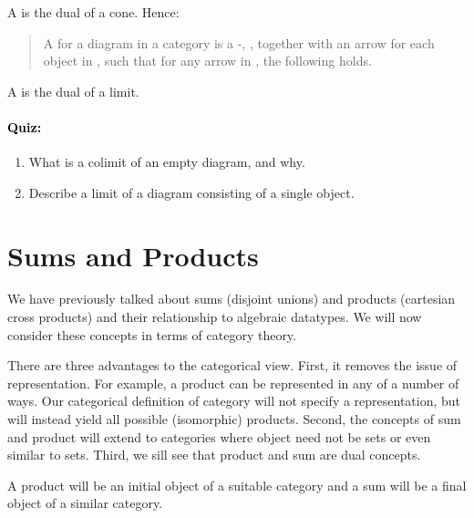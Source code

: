 \documentclass{seminar}
\newcommand{\CC}{\tm{\cal C}}
\newcommand{\CCC}{\tm{{\cal C}\,}}
\begin{document}
\begin{slide}
A  is the dual of a cone.  Hence:
\begin{quote}
A  for a diagram  in a category \CCC is a
\CC-, , together with an arrow
 for each
object  in , such that for any arrow
 in , the following holds.
\begin{codenott}
\end{codenott}
\end{quote}
A  is the dual of a limit.

\paragraph{\textcolor{black}{Quiz:}}

\color{QuoteColor}
\begin{enumerate}
\item What is a colimit of an empty diagram, and why.
\item Describe a limit of a diagram consisting of a single object.
\end{enumerate}
\color{black}

\newslide

\section*{Sums and Products}

We have previously talked about sums (disjoint unions) and products
(cartesian cross products) and their relationship to \Has algebraic
datatypes.  We will now consider these concepts in terms of category
theory.

There are three advantages to the categorical view.  First, it
removes the
issue of representation.  For example, a product can be represented
in any
of a number of ways.  Our categorical definition of category will
not
specify a representation, but will instead yield all possible
(isomorphic)
products.  Second, the concepts of sum and product will extend to
categories
where object need not be sets or even similar to sets.  Third, we
sill see
that product and sum are dual concepts.

A product will be an initial object of a suitable category and a
sum will be
a final object of a similar category.


\end{slide}
\end{document}
